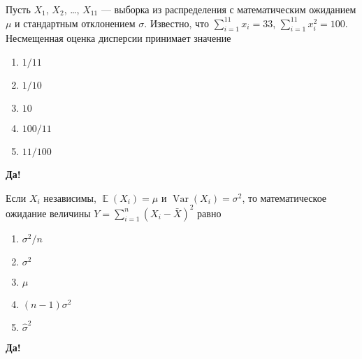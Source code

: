 \documentclass[t]{beamer}
\DeclareMathOperator{\Var}{Var}
\DeclareMathOperator{\E}{\mathbb{E}}
\begin{document}
 \begin{frame} \label{34-Yes} 
\begin{block}{34} 

Пусть $X_1$, $X_2$, \ldots, $X_{11}$ — выборка из распределения с математическим ожиданием $\mu$ и стандартным отклонением $\sigma$. Известно, что $\sum_{i=1}^{11}x_i=33$, $\sum_{i=1}^{11}x_i^2=100$. Несмещенная оценка дисперсии принимает значение
 


 \end{block} 
\begin{enumerate} 
\item[] \hyperlink{34-No}{\beamergotobutton{} $1/11$}
\item[] \hyperlink{34-Yes}{\beamergotobutton{} $1/10$}
\item[] \hyperlink{34-No}{\beamergotobutton{} $10$}
\item[] \hyperlink{34-No}{\beamergotobutton{} $100/11$}
\item[] \hyperlink{34-No}{\beamergotobutton{} $11/100$}
\end{enumerate} 

 \textbf{Да!} 
 \hyperlink{35}{}\end{frame} 


 \begin{frame} \label{35-Yes} 
\begin{block}{35} 

Если $X_i$ независимы, $\E(X_i)=\mu$ и $\Var(X_i)=\sigma^2$, то математическое ожидание величины $Y=\sum_{i=1}^{n}(X_i-\bar{X})^2$ равно
 


 \end{block} 
\begin{enumerate} 
\item[] \hyperlink{35-No}{\beamergotobutton{} $\sigma^2/n$}
\item[] \hyperlink{35-No}{\beamergotobutton{} $\sigma^2$}
\item[] \hyperlink{35-No}{\beamergotobutton{} $\mu$}
\item[] \hyperlink{35-Yes}{\beamergotobutton{} $(n-1)\sigma^2$}
\item[] \hyperlink{35-No}{\beamergotobutton{} $\hat\sigma^2$}
\end{enumerate} 

 \textbf{Да!} 
 \hyperlink{36}{}\end{frame} 
\end{document}
